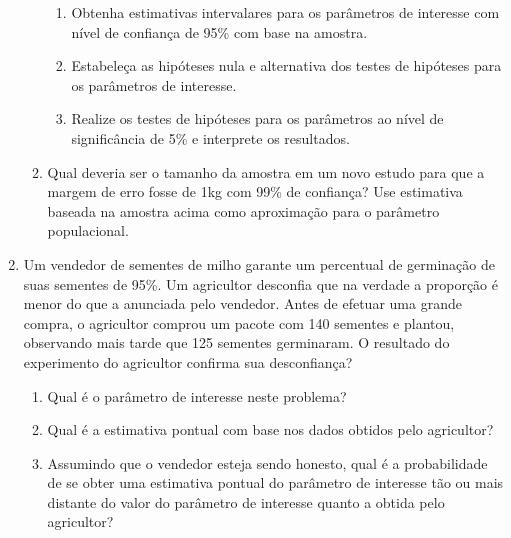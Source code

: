 \documentclass[
]{article}
\begin{document}
\begin{enumerate}
\begin{enumerate}
\begin{enumerate}
\item Obtenha estimativas intervalares para os parâmetros de interesse com nível de confiança de 95\% com base na amostra. 





\item Estabeleça as hipóteses nula e alternativa dos testes de hipóteses para os parâmetros de interesse.





\item Realize os testes de hipóteses para os parâmetros ao nível de significância de 5\% e interprete os resultados. 









\end{enumerate}
\item Qual deveria ser o tamanho da amostra em um novo estudo para que a margem de erro fosse de 1kg com 99\% de confiança? Use estimativa baseada na amostra acima como aproximação para o parâmetro populacional.




\end{enumerate}

\newpage



\item Um vendedor de sementes de milho garante um percentual de germinação de suas sementes de 95\%. Um agricultor desconfia que na verdade a proporção é menor do que a anunciada pelo vendedor. Antes de efetuar uma grande compra, o agricultor comprou um pacote com 140 sementes e plantou, observando mais tarde que 125 sementes germinaram. O resultado do experimento do agricultor confirma sua desconfiança? 
\begin{enumerate}
\item Qual é o parâmetro de interesse neste problema?

\item Qual é a estimativa pontual com base nos dados obtidos pelo agricultor?

\item Assumindo que o vendedor esteja sendo honesto, qual é a probabilidade de se obter uma estimativa pontual do parâmetro de interesse tão ou mais distante do valor do parâmetro de interesse quanto a obtida pelo agricultor?


\end{enumerate}
\end{enumerate}
\end{document}

